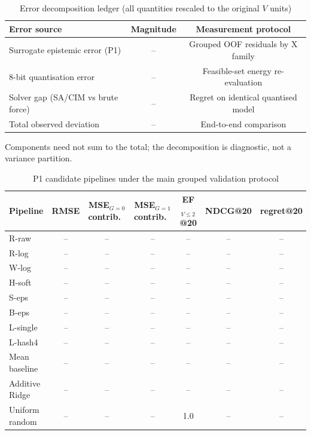 \begin{table}[htbp]
  \centering
  \caption{Error decomposition ledger (all quantities rescaled to the original $V$ units)}
  \label{tab:error_decomposition}
  \begin{tabular}{lcc}
    \toprule
    Error source & Magnitude & Measurement protocol \\
    \midrule
    Surrogate epistemic error (P1)      & -- & Grouped OOF residuals by X family \\
    8-bit quantisation error            & -- & Feasible-set energy re-evaluation \\
    Solver gap (SA/CIM vs brute force)  & -- & Regret on identical quantised model \\
    \midrule
    Total observed deviation            & -- & End-to-end comparison \\
    \bottomrule
  \end{tabular}
  \begin{minipage}{\linewidth}\vspace{2pt}\footnotesize
    Components need not sum to the total; the decomposition is diagnostic,
    not a variance partition.
  \end{minipage}
\end{table}

\begin{table}[htbp]
  \centering
  \caption{P1 candidate pipelines under the main grouped validation protocol}
  \label{tab:p1_model_comparison}
  \begin{tabular}{lcccccc}
    \toprule
    Pipeline & RMSE & MSE$_{G=0}$ contrib.\ & MSE$_{G=1}$ contrib.\ & EF$_{V\le2}$@20 & NDCG@20 & regret@20 \\
    \midrule
    R-raw    & -- & -- & -- & -- & -- & -- \\
    R-log    & -- & -- & -- & -- & -- & -- \\
    W-log    & -- & -- & -- & -- & -- & -- \\
    H-soft   & -- & -- & -- & -- & -- & -- \\
    S-eps    & -- & -- & -- & -- & -- & -- \\
    B-eps    & -- & -- & -- & -- & -- & -- \\
    L-single & -- & -- & -- & -- & -- & -- \\
    L-hash4  & -- & -- & -- & -- & -- & -- \\
    \midrule
    Mean baseline   & -- & -- & -- & -- & -- & -- \\
    Additive Ridge  & -- & -- & -- & -- & -- & -- \\
    Uniform random  & -- & -- & -- & 1.0 & -- & -- \\
    \bottomrule
  \end{tabular}
\end{table}

